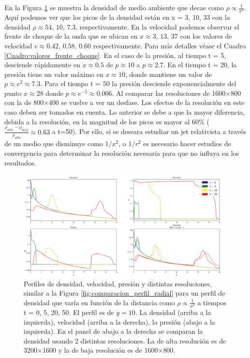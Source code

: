 \documentclass[12pt,a4paper]{book}
\begin{document}
En la Figura \ref{fig:Decaimiento_cuadratico_densidad_jet} se muestra la densidad de medio ambiente que decae como $\rho \varpropto \frac{1}{x^2}$. Aquí podemos ver que los  picos de la densidad están en x = 3, 10, 33 con
la densidad $\rho \approx 54, \,  10, \,  7.3$, respectivamente. En la velocidad podemos observar el frente de choque de la onda que se ubican en $x \approx 3, \, 13, \, 37$ con los valores de velocidad 
$v \approx 0.42, \, 0.58, \, 0.60$ respectivamente. Para más detalles véase el Cuadro \ref{Cuadro:valores_frente_choque}.
En el caso de la presión, al tiempo t = 5, desciende rápidamente en $x \approx 0.5$ de $p  \approx 10$ a $p  \approx 2.7$. En el tiempo t = 20, la presión tiene un valor máximo en $x \approx 10$, donde mantiene un 
valor de $p \approx e^2 \approx 7.3$. Para el tiempo t = 50 la presión desciende exponencialmente del punto $x \approx 28$ donde $p \approx e^{-5} \approx 0.006$. Al comparar las resoluciones de 1600$\times$800 con 
la de 800$\times$400 se vuelve a ver un desfase. Los efectos de la resolución en este caso deben ser tomados en cuenta. Lo anterior se debe a que la mayor diferencia, debida a la resolución, en la magnitud de 
los picos es mayor al 60\% ($\frac{\rho_{alta} - \rho_{baja}}{\rho_{alta}} \approx 0.63$ a t=50). Por ello, si se deseara estudiar un jet relativista a través de un medio que disminuye como $1/x^2$, o $1/r^2$ es 
necesario hacer estudios de convergencia para determinar la resolución necesaria para que no influya en los resultados. 

\begin{figure}
  \centering
  \includegraphics[width = 1.0\textwidth]{./Figuras/jet/perfiles/perfiles_cuadraticos.png}
  \caption{Perfiles de densidad, velocidad, presión y distintas resoluciones, similar a la Figura 
  \ref{fig:comparacion_perfil_radial} para un perfil de densidad que varía en función de la distancia como
  $\rho \varpropto \frac{1}{x^2}$ a tiempos t = 0, 5, 20, 50.
  El perfil es de $y = 10$.
  La densidad (arriba a la izquierda), velocidad (arriba a la derecha), la presión (abajo a la izquierda). 
  En el panel de abajo a la derecha se comparan la densidad usando 2 distintas resoluciones. La de alta resolución
  es de 3200$\times$1600 y la de baja resolución es de 1600$\times$800.}\label{fig:Decaimiento_cuadratico_densidad_jet}
\end{figure}
\end{document}
